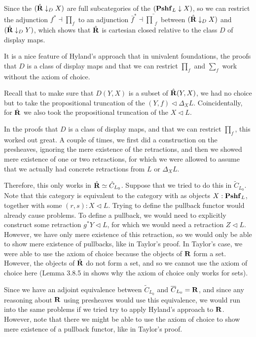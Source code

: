 \begin{corollary}\label{cor:relatively-cartesian-closed}
  Since the $ (\hat {\mathbf{R}} \downarrow_D X) $ are full subcategories of the $ (\mathbf{Pshf}_{L} \downarrow X) $, so we can restrict the adjunction $ f^* \dashv \prod_f $ to an adjunction $ \bar f^* \dashv \bar \prod_f $ between $ (\hat {\mathbf{R}} \downarrow_D X) $ and $ (\hat {\mathbf{R}} \downarrow_D Y) $, which shows that $ \hat {\mathbf{R}} $ is cartesian closed relative to the class $ D $ of display maps.
\end{corollary}

\begin{remark}
  It is a nice feature of Hyland's approach that in univalent foundations, the proofs that $ D $ is a class of display maps and that we can restrict $ \prod_f $ and $ \sum_f $ work without the axiom of choice.
\end{remark}

\begin{remark}\label{rem:difference-Taylor-Hyland}
  Recall that to make sure that $ D(Y, X) $ is a subset of $ \hat {\mathbf{R}}(Y, X) $, we had no choice but to take the propositional truncation of the $ (Y, f) \triangleleft \Delta_X L $. Coincidentally, for $ \hat {\mathbf{R}} $ we also took the propositional truncation of the $ X \triangleleft L $.

  In the proofs that $ D $ is a class of display maps, and that we can restrict $ \prod_f $, this worked out great. A couple of times, we first did a construction on the presheaves, ignoring the mere existence of the retractions, and then we showed mere existence of one or two retractions, for which we were allowed to assume that we actually had concrete retractions from $ L $ or $ \Delta_X L $.

  Therefore, this only works in $ \hat {\mathbf{R}} \simeq \hat C_{L_0} $. Suppose that we tried to do this in $ \tilde C_{L_0} $. Note that this category is equivalent to the category with as objects $ X : \mathbf{Pshf}_{L} $, together with some $ (r, s) : X \triangleleft L $. Trying to define the pullback functor would already cause problems. To define a pullback, we would need to explicitly construct some retraction $ g^* Y \triangleleft L $, for which we would need a retraction $ Z \triangleleft L $. However, we have only mere existence of this retraction, so we would only be able to show mere existence of pullbacks, like in Taylor's proof. In Taylor's case, we were able to use the axiom of choice because the objects of $ \mathbf{R} $ form a set. However, the objects of $ \tilde {\mathbf{R}} $ do not form a set, and so we cannot use the axiom of choice here (Lemma 3.8.5 in \autocite{hottbook} shows why the axiom of choice only works for sets).

  Since we have an adjoint equivalence between $ \tilde C_{L_0} $ and $ \overline C_{L_0} = \mathbf{R} $, and since any reasoning about $ \mathbf{R} $ using presheaves would use this equivalence, we would run into the same problems if we tried try to apply Hyland's approach to $ \mathbf{R} $. However, note that there we might be able to use the axiom of choice to show mere existence of a pullback functor, like in Taylor's proof.
\end{remark}

